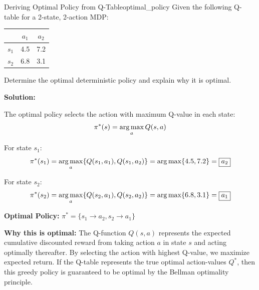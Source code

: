\begin{example}{Deriving Optimal Policy from Q-Table}{optimal_policy}
Given the following Q-table for a 2-state, 2-action MDP:

\begin{center}
\begin{tabular}{c|cc}
& $a_1$ & $a_2$ \\
\hline
$s_1$ & 4.5 & 7.2 \\
$s_2$ & 6.8 & 3.1 \\
\end{tabular}
\end{center}

Determine the optimal deterministic policy and explain why it is optimal.

\tcblower
\textbf{Solution:}

The optimal policy selects the action with maximum Q-value in each state:
\begin{equation}
\pi^*(s) = \operatorname*{arg\,max}_a Q(s, a)
\end{equation}

For state $s_1$:
\begin{equation}
\pi^*(s_1) = \operatorname*{arg\,max}_a \{Q(s_1, a_1), Q(s_1, a_2)\} = \operatorname*{arg\,max}\{4.5, 7.2\} = \boxed{a_2}
\end{equation}

For state $s_2$:
\begin{equation}
\pi^*(s_2) = \operatorname*{arg\,max}_a \{Q(s_2, a_1), Q(s_2, a_2)\} = \operatorname*{arg\,max}\{6.8, 3.1\} = \boxed{a_1}
\end{equation}

\textbf{Optimal Policy:} $\pi^* = \{s_1 \rightarrow a_2, s_2 \rightarrow a_1\}$

\textbf{Why this is optimal:} The Q-function $Q(s,a)$ represents the expected cumulative discounted reward from taking action $a$ in state $s$ and acting optimally thereafter. By selecting the action with highest Q-value, we maximize expected return. If the Q-table represents the true optimal action-values $Q^*$, then this greedy policy is guaranteed to be optimal by the Bellman optimality principle.
\end{example}

